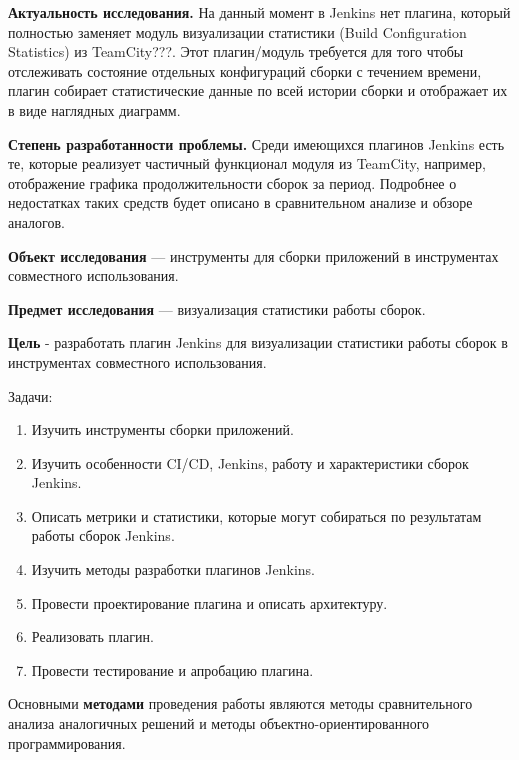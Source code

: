 \textbf{Актуальность исследования.} На данный момент в Jenkins нет плагина, который полностью заменяет модуль визуализации статистики (Build Configuration Statistics) из TeamCity???. Этот плагин/модуль требуется для того чтобы отслеживать состояние отдельных конфигураций сборки с течением времени, плагин собирает статистические данные по всей истории сборки и отображает их в виде наглядных диаграмм.

\textbf{Степень разработанности проблемы.} Среди имеющихся плагинов Jenkins есть те, которые реализует частичный функционал модуля из TeamCity, например, отображение графика продолжительности сборок за период. Подробнее о недостатках таких средств будет описано в сравнительном анализе и обзоре аналогов. 


\textbf{Объект исследования} — инструменты для сборки приложений в инструментах совместного использования.

\textbf{Предмет исследования} — визуализация статистики работы сборок.

\textbf{Цель} - разработать плагин Jenkins для визуализации статистики работы сборок в инструментах совместного использования.

Задачи:
 
\begin{enumerate}
	\item Изучить инструменты сборки приложений.
	
	\item Изучить особенности CI/CD, Jenkins, работу и характеристики сборок Jenkins.
	
	\item Описать метрики и статистики, которые могут собираться по результатам работы сборок Jenkins.
	
	\item Изучить методы разработки плагинов Jenkins.
	
	\item Провести проектирование плагина и описать архитектуру.
	
	\item Реализовать плагин.
	
	\item Провести тестирование и апробацию плагина. 
	
\end{enumerate}

Основными \textbf{методами} проведения работы являются методы сравнительного анализа аналогичных решений и методы объектно-ориентированного программирования.





